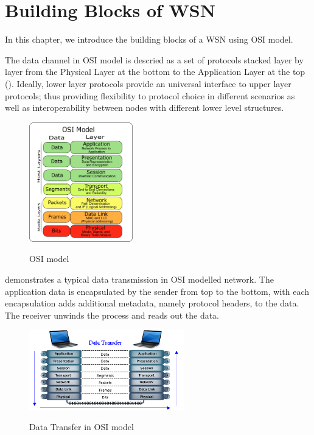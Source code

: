 \chapter{Building Blocks of WSN} \label{Chp: Building Blocks}

In this chapter, we introduce the building blocks of a WSN using OSI model\cite{OSI}.

The data channel in OSI model is descried as a set of protocols stacked layer by layer from the Physical Layer at the bottom to the Application Layer at the top (). Ideally, lower layer protocols provide an universal  interface to upper layer protocols; thus providing flexibility to protocol choice in different scenarios as well as interoperability between nodes with different lower level structures.

\begin{figure}[h!]
	\centering
	{
		\includegraphics[width=0.4\textwidth,]{fig/Osi-model-jb.png}
	}
	\caption{OSI model} \label{fig: OSI model}
\end{figure}

 demonstrates a typical data transmission in OSI modelled network. The application data is encapsulated by the sender from top to the bottom, with each encapsulation adds additional metadata, namely protocol headers, to the data. The receiver unwinds the process and reads out the data.

\begin{figure}[h!]
	\centering
	{
		\includegraphics[width=0.6\textwidth,]{fig/osi-model.png}
	}
	\caption{Data Transfer in OSI model} \label{fig: OSI channel}
\end{figure}

